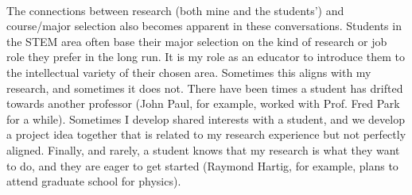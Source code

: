 \documentclass[../../../main.tex]{subfiles}
\begin{document}
\\
\vspace{0.25cm}
The connections between research (both mine and the students') and course/major selection also becomes apparent in these conversations.  Students in the STEM area often base their major selection on the kind of research or job role they prefer in the long run.  It is my role as an educator to introduce them to the intellectual variety of their chosen area.  Sometimes this aligns with my research, and sometimes it does not.  There have been times a student has drifted towards another professor (John Paul, for example, worked with Prof. Fred Park for a while).  Sometimes I develop shared interests with a student, and we develop a project idea together that is related to my research experience but not perfectly aligned.  Finally, and rarely, a student knows that my research is what they want to do, and they are eager to get started (Raymond Hartig, for example, plans to attend graduate school for physics).
\end{document}
